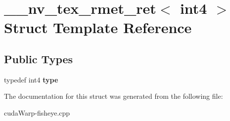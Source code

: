 \hypertarget{struct____nv__tex__rmet__ret_3_01int4_01_4}{}\section{\+\_\+\+\_\+nv\+\_\+tex\+\_\+rmet\+\_\+ret$<$ int4 $>$ Struct Template Reference}
\label{struct____nv__tex__rmet__ret_3_01int4_01_4}
\subsection*{Public Types}
\begin{DoxyCompactItemize}
\item 
typedef int4 {\bfseries type}\hypertarget{struct____nv__tex__rmet__ret_3_01int4_01_4_ab4d2673eed525b9d1021be0af0c6f514}{}\label{struct____nv__tex__rmet__ret_3_01int4_01_4_ab4d2673eed525b9d1021be0af0c6f514}

\end{DoxyCompactItemize}


The documentation for this struct was generated from the following file\+:\begin{DoxyCompactItemize}
\item 
cuda\+Warp-\/fisheye.\+cpp\end{DoxyCompactItemize}
